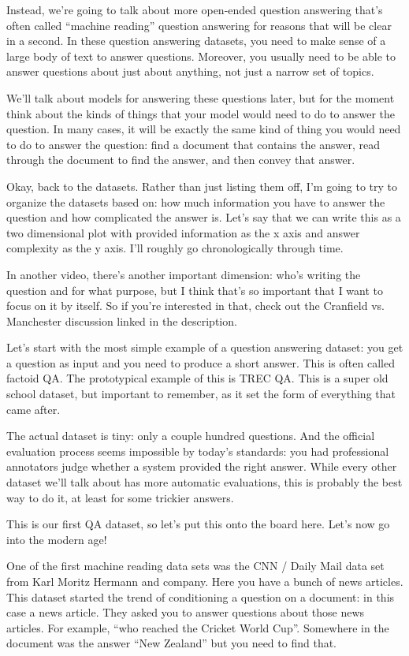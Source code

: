 Instead, we're going to talk about more open-ended question answering that’s often called “machine reading” question answering for reasons that will be clear in a second.  In these question answering datasets, you need to make sense of a large body of text to answer questions.  Moreover, you usually need to be able to answer questions about just about anything, not just a narrow set of topics.

We'll talk about models for answering these questions later, but for the moment think about the kinds of things that your model would need to do to answer the question.  In many cases, it will be exactly the same kind of thing you would need to do to answer the question: find a document that contains the answer, read through the document to find the answer, and then convey that answer.

Okay, back to the datasets.  Rather than just listing them off, I’m going to try to organize the datasets based on: how much information you have to answer the question and how complicated the answer is.  Let’s say that we can write this as a two dimensional plot with provided information as the x axis and answer complexity as the y axis.  I’ll roughly go chronologically through time.

In another video, there’s another important dimension: who’s writing the question and for what purpose, but I think that’s so important that I want to focus on it by itself.  So if you’re interested in that, check out the Cranfield vs. Manchester discussion linked in the description. 

Let’s start with the most simple example of a question answering dataset: you get a question as input and you need to produce a short answer.  This is often called factoid QA.  The prototypical example of this is TREC QA.  This is a super old school dataset, but important to remember, as it set the form of everything that came after.

The actual dataset is tiny: only a couple hundred questions.  And the official evaluation process seems impossible by today’s standards: you had professional annotators judge whether a system provided the right answer.  While every other dataset we’ll talk about has more automatic evaluations, this is probably the best way to do it, at least for some trickier answers.

This is our first QA dataset, so let’s put this onto the board here.  Let’s now go into the modern age!

One of the first machine reading data sets was the CNN / Daily Mail data set from Karl Moritz Hermann and company.  Here you have a bunch of news articles.  This dataset started the trend of conditioning a question on a document: in this case a news article.  They asked you to answer questions about those news articles.  For example, “who reached the Cricket World Cup”.  Somewhere in the document was the answer “New Zealand” but you need to find that.

